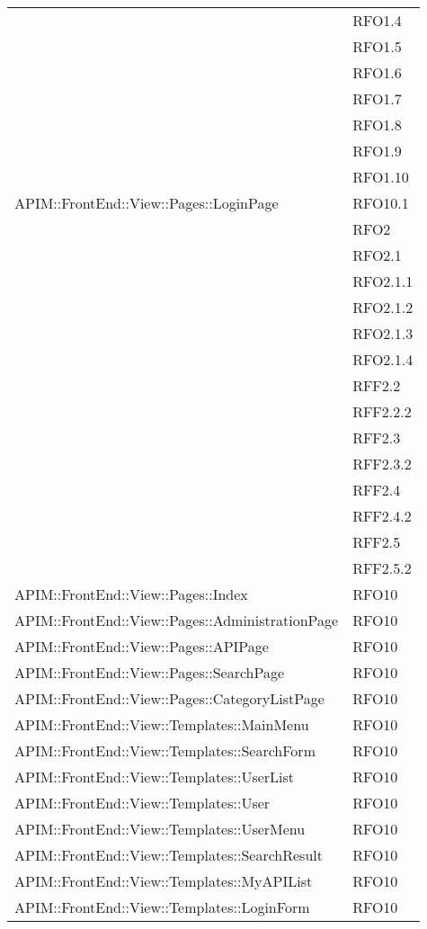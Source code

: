 \begin{longtable}{ p{14cm} | p{2cm} }
			&RFO1.4 \\
			&RFO1.5 \\
			&RFO1.6 \\
			&RFO1.7 \\
			&RFO1.8 \\
			&RFO1.9 \\
			&RFO1.10 \\
			\hline
			APIM::FrontEnd::View::Pages::LoginPage& RFO10.1 \\
			&RFO2 \\
			&RFO2.1 \\
			&RFO2.1.1\\
			&RFO2.1.2\\
			&RFO2.1.3\\
			&RFO2.1.4\\
			&RFF2.2\\
			&RFF2.2.2\\
			&RFF2.3\\
			&RFF2.3.2\\
			&RFF2.4\\
			&RFF2.4.2\\
			&RFF2.5\\
			&RFF2.5.2\\
			\hline
			APIM::FrontEnd::View::Pages::Index& RFO10 \\
			\hline
			APIM::FrontEnd::View::Pages::AdministrationPage& RFO10 \\
			\hline
			APIM::FrontEnd::View::Pages::APIPage& RFO10 \\
			\hline
		    APIM::FrontEnd::View::Pages::SearchPage& RFO10 \\
		    \hline
		    APIM::FrontEnd::View::Pages::CategoryListPage& RFO10 \\
		    \hline
		    APIM::FrontEnd::View::Templates::MainMenu& RFO10 \\
		    \hline
		    APIM::FrontEnd::View::Templates::SearchForm& RFO10 \\
		    \hline
		    APIM::FrontEnd::View::Templates::UserList& RFO10 \\		 
		    \hline   
		    APIM::FrontEnd::View::Templates::User& RFO10 \\	
		    \hline	    
		    APIM::FrontEnd::View::Templates::UserMenu& RFO10 \\	
		    \hline	    
		    APIM::FrontEnd::View::Templates::SearchResult& RFO10 \\	
		    \hline	    
		    APIM::FrontEnd::View::Templates::MyAPIList& RFO10 \\
		    \hline		    
		    APIM::FrontEnd::View::Templates::LoginForm& RFO10 \\	

\end{longtable}
